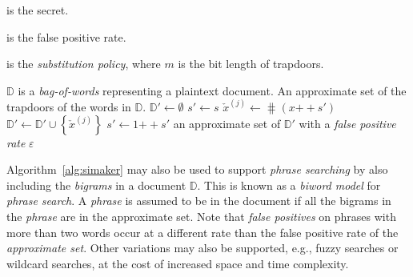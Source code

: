 \documentclass[final,11pt]{article}
\newcommand{\catop}{{+\!\!+}}
\newcommand{\cisb}{\mathbb{B}}
\numberwithin{equation}{section}
\theoremstyle{plain}
\theoremstyle{remark}
\begin{document}
\begin{algorithm}[h]
    \caption{Plaintext document to secure index \emph{bag-of-words} generator}
    \label{alg:simaker}
    \parameters
    {
        \begin{description}[noitemsep]
            \item[$s \in \cisb$] is the secret.
            \item[$\varepsilon$] is the false positive rate.
            \item[$\substitutions \colon \cisb \mapsto \cisb_m$] is the \emph{substitution policy}, where $m$ is the bit length of trapdoors.
        \end{description}
    }
    \KwIn
    {
        $\mathbb{D}$ is a \emph{bag-of-words} representing a plaintext document.
    }
    \KwOut
    {
        An approximate set of the trapdoors of the words in $\mathbb{D}$.
    }
    {
        $\mathbb{D}' \gets \emptyset$\;
        {
            $s' \gets s$\;
            {
                $\check{x}^{(j)} \gets \hash(x \catop s')$\;
                $\mathbb{D}' \gets \mathbb{D}' \cup \left\{\check{x}^{(j)}\right\}$\;
                $s' \gets 1 \catop s'$\;
            }
        }
        \Return an approximate set of $\mathbb{D}'$ with a \emph{false positive rate} $\varepsilon$\;
    }
\end{algorithm}

Algorithm~\ref{alg:simaker} may also be used to support \emph{phrase searching} by also including the \emph{bigrams} in a document $\mathbb{D}$. This is known as a \emph{biword model} for \emph{phrase search}\cite{manning2008introduction}. A \emph{phrase} is assumed to be in the document if all the bigrams in the \emph{phrase} are in the approximate set. Note that \emph{false positives} on phrases with more than two words occur at a different rate than the false positive rate of the \emph{approximate set}. Other variations may also be supported, e.g., fuzzy searches or wildcard searches, at the cost of increased space and time complexity.
\end{document}
